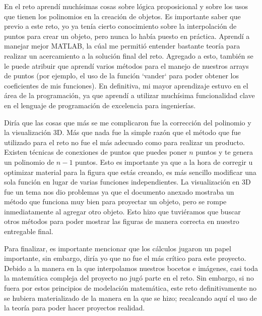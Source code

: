 
\tab En el reto aprendí muchísimas cosas sobre lógica proposicional y sobre los usos que tienen los polinomios en la creación de objetos. Es importante saber que previo a este reto, yo ya tenía cierto conocimiento sobre la interpolación de puntos para crear un objeto, pero nunca lo había puesto en práctica. Aprendí a manejar mejor MATLAB, la cúal me permitió entender bastante teoría para realizar un acercamiento a la solución final del reto. Agregado a esto, también se le puede atribuir que aprendí varios métodos para el manejo de nuestros arrays de puntos (por ejemplo, el uso de la función `vander` para poder obtener los coeficientes de mis funciones). En definitiva, mi mayor aprendizaje estuvo en el área de la programación, ya que aprendí a utilizar muchísima funcionalidad clave en el lenguaje de programación de excelencia para ingenierías.

\tab Diría que las cosas que más se me complicaron fue la corrección del polinomio y la visualización 3D. Más que nada fue la simple razón que el método que fue utilizado para el reto no fue el más adecuado como para realizar un producto. Existen técnicas de conexiones de puntos que puedes poner $n$ puntos y te genera un polinomio de $n-1$ puntos. Esto es importante ya que a la hora de corregir u optimizar material para la figura que estás creando, es más sencillo modificar una sola función en lugar de varias funciones independientes. La visualización en 3D fue un tema nos dio problemas ya que el documento anexado mostraba un método que funciona muy bien para proyectar un objeto, pero se rompe inmediatamente al agregar otro objeto. Esto hizo que tuviéramos que buscar otros métodos para poder mostrar las figuras de manera correcta en nuestro entregable final.

\tab Para finalizar, es importante mencionar que los cálculos jugaron un papel importante, sin embargo, diría yo que no fue el más crítico para este proyecto. Debido a la manera en la que interpolamos nuestros bocetos e imágenes, casi toda la matemática compleja del proyecto no jugó parte en el reto. Sin embargo, si no fuera por estos principios de modelación matemática, este reto definitivamente no se hubiera materializado de la manera en la que se hizo; recalcando aquí el uso de la teoría para poder hacer proyectos realidad.
